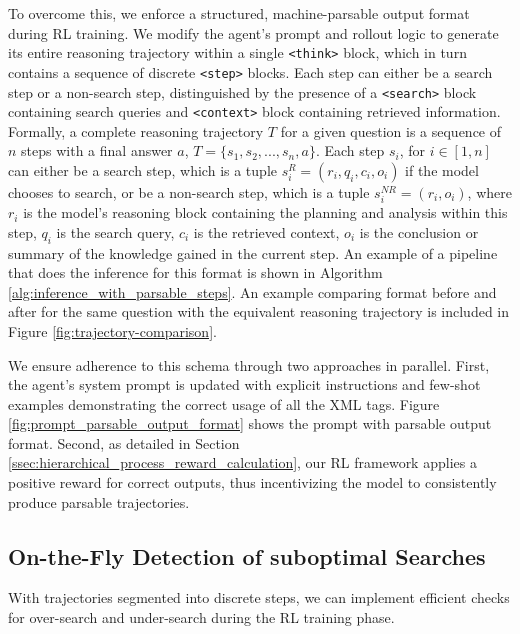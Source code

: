 \documentclass{article}
\begin{document}
To overcome this, we enforce a structured, machine-parsable output format during RL training. We modify the agent's prompt and rollout logic to generate its entire reasoning trajectory within a single \texttt{<think>} block, which in turn contains a sequence of discrete \texttt{<step>} blocks. Each step can either be a search step or a non-search step, distinguished by the presence of a \texttt{<search>} block containing search queries and \texttt{<context>} block containing retrieved information. Formally, a complete reasoning trajectory $T$ for a given question is a sequence of $n$ steps with a final answer $a$, $T=\{s_1, s_2, ..., s_n, a\}$. Each step $s_i$, for $i \in [1, n]$ can either be a search step, which is a tuple $s^R_i=(r_i, q_i, c_i, o_i)$ if the model chooses to search, or be a non-search step, which is a tuple $s^{NR}_i=(r_i, o_i)$, where $r_i$ is the model's reasoning block containing the planning and analysis within this step, $q_i$ is the search query, $c_i$ is the retrieved context, $o_i$ is the conclusion or summary of the knowledge gained in the current step. An example of a pipeline that does the inference for this format is shown in Algorithm \ref{alg:inference_with_parsable_steps}. An example comparing format before and after for the same question with the equivalent reasoning trajectory is included in Figure \ref{fig:trajectory-comparison}.

We ensure adherence to this schema through two approaches in parallel. First, the agent's system prompt is updated with explicit instructions and few-shot examples demonstrating the correct usage of all the XML tags. Figure \ref{fig:prompt_parsable_output_format} shows the prompt with parsable output format. Second, as detailed in Section \ref{ssec:hierarchical_process_reward_calculation}, our RL framework applies a positive reward for correct outputs, thus incentivizing the model to consistently produce parsable trajectories.

\subsection{On-the-Fly Detection of suboptimal Searches}
\label{ssec:on_the_fly_detection_of_sub_optimal_searches}
With trajectories segmented into discrete steps, we can implement efficient checks for over-search and under-search during the RL training phase.
\end{document}
